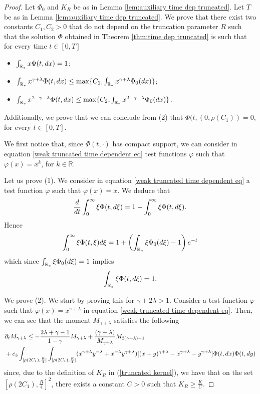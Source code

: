\documentclass[10pt,a4paper]{amsart}
\newcommand{\der}{\textup{d}}
\begin{document}
\begin{proof}

Let $\Phi_0$ and $K_R$ be as in Lemma \ref{lem:auxiliary time dep truncated}. 
Let $T$ be as in Lemma \ref{lem:auxiliary time dep truncated}. We prove that there exist two constants $C_{1},C_{2}>0$ that do not depend on the truncation parameter $R$ such that the solution $\Phi$ obtained in Theorem \ref{thm:time dep truncated} is such that for every time $t \in [0, T] $ 
\begin{itemize}
        \item[(1)]
$\int_{\mathbb R_* } x \Phi(t,\der x) = 1$; 
    \item[(2)]$\int_{\mathbb R_* } x^{\gamma + \lambda } \Phi(t, \der x) \leq \max\{ C_1,\int_{\mathbb R_* } x^{\gamma + \lambda } \Phi_{0}( \der x)\}$; 
    \item[(3)] $\int_{\mathbb R_* } x^{2- \gamma - \lambda } \Phi(t, \der x) \leq  \max\{C_{2},\int_{\mathbb R_* } x^{2-\gamma-\lambda} \Phi_{0}( \der x)\}$.
\end{itemize}
Additionally, we prove that we can conclude from (2) that $\Phi(t,(0,\rho(C_{1}))=0$, for every $t\in[0,T]$.

We first notice that, since $\Phi(t, \cdot)$ has compact support, we can consider in equation \eqref{weak truncated time dependent eq} test functions $\varphi$ such that $\varphi(x)=x^{k} $, for $k\in\mathbb{R}.$

Let us prove (1). We consider in equation \eqref{weak truncated time dependent eq} a test function $\varphi$ such that $\varphi(x)=x $.
We deduce that 
\[
\frac{d}{dt} \int_0^\infty \xi \Phi(t, \der \xi)=1- \int_0^\infty \xi \Phi(t,\der \xi).
\]
Hence 
\[
\int_0^\infty \xi \Phi(t,\xi) d \xi = 1+ \left( \int_{\mathbb R_*} \xi \Phi_0(\der\xi) -1 \right) e^{-t} 
\]
which since $\int_{\mathbb R_*} \xi \Phi_0(\der \xi)=1 $ implies 
\begin{equation} \label{lower bound mass truncated}
 \int_{\mathbb R_*}\xi \Phi(t, \der \xi) = 1.
\end{equation} 



We prove (2). 
We start by proving this for $\gamma + 2 \lambda >1. $
Consider a test function $\varphi $ such that $\varphi(x)=x^{\gamma +\lambda}$
in equation \eqref{weak truncated time dependent eq}. 
Then, we can see that the moment $M_{\gamma + \lambda}$ satisfies the following 
\begin{align*}
& \partial_{t}M_{\gamma +\lambda} \leq - \frac{2\lambda + \gamma -1 }{1-\gamma} M_{\gamma+\lambda}
+ \frac{(\gamma +\lambda)}{M_{\gamma+\lambda}}  M_{2(\gamma+\lambda)-1} \\
&+ c_{3}\int_{[\rho(2C_{1}), \frac{R}{4}] }
 \int_{[\rho(2C_{1}), \frac{R}{4} ] } (x^{\gamma + \lambda} y^{-\lambda} + x^{-\lambda} y^{\gamma + \lambda} ) [ (x+y)^{\gamma + \lambda} - x^{\gamma + \lambda} - y^{\gamma + \lambda}]  \Phi(t, \der x ) \Phi(t, \der y ) 
 \end{align*} 
since, due to the definition of $K_{R}$ in (\ref{truncated kernel}), we have that on the set $[\rho(2C_{1}),\frac{R}{4}]^{2}$, there exists a constant $C>0$ such that $K_{R}\geq\frac{K}{C}$. 


\end{proof}
\end{document}
